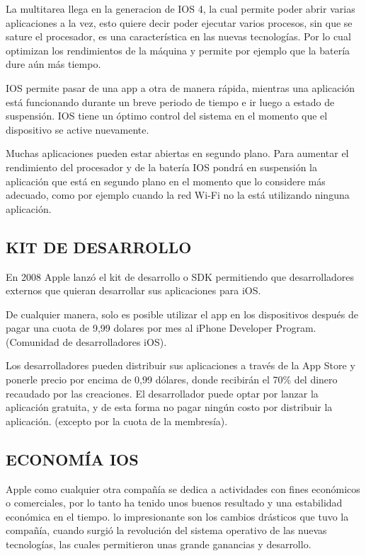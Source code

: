 La multitarea llega en la generacion de IOS 4, la cual permite
poder abrir varias aplicaciones a la vez, esto quiere decir poder
ejecutar varios procesos, sin que se sature el procesador, es una
característica en las nuevas tecnologías. Por lo cual optimizan
los rendimientos de la máquina y permite por ejemplo que la
batería dure aún más tiempo.

IOS permite pasar de una app a otra de manera rápida,
mientras una aplicación está funcionando durante un breve
periodo de tiempo e ir luego a estado de suspensión. IOS
tiene un óptimo control del sistema en el momento que el
dispositivo se active nuevamente.

Muchas aplicaciones pueden estar abiertas en segundo
plano. Para aumentar el rendimiento del procesador y de la
batería IOS pondrá en suspensión la aplicación que está en
segundo plano en el momento que lo considere más
adecuado, como por ejemplo cuando la red Wi-Fi no la está
utilizando ninguna aplicación.

\subsection*{KIT DE DESARROLLO}

En 2008 Apple lanzó el kit de desarrollo o SDK permitiendo que
desarrolladores externos que quieran desarrollar sus
aplicaciones para iOS.

De cualquier manera, solo es posible utilizar el app en los
dispositivos después de pagar una cuota de 9,99 dolares por mes
al iPhone Developer Program. (Comunidad de desarrolladores
iOS).

Los desarrolladores pueden distribuir sus aplicaciones a través
de la App Store y ponerle precio por encima de 0,99 dólares,
donde recibirán el 70\% del dinero recaudado por las creaciones.
El desarrollador puede optar por lanzar la aplicación gratuita, y
de esta forma no pagar ningún costo por distribuir la aplicación.
(excepto por la cuota de la membresía).

\subsection*{ECONOMÍA IOS}

Apple como cualquier otra compañía se dedica a actividades
con fines económicos o comerciales, por lo tanto ha tenido unos
buenos resultado y una estabilidad económica en el tiempo. lo
impresionante son los cambios drásticos que tuvo la compañía,
cuando surgió la revolución del sistema operativo de las nuevas
tecnologías, las cuales permitieron unas grande ganancias y
desarrollo.

